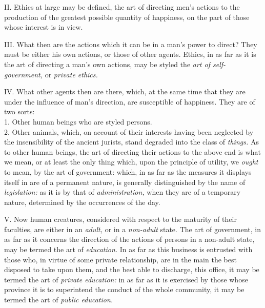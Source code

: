 \documentclass[12pt]{report}
\begin{document}
II. Ethics at large may be defined, the art of directing men's actions
to the production of the greatest possible quantity of happiness, on the
part of those whose interest is in view.

III. What then are the actions which it can be in a man's power to
direct? They must be either his own actions, or those of other agents.
Ethics, in as far as it is the art of directing a man's own actions, may
be styled the \emph{art of self-government,} or \emph{private ethics.}

IV. What other agents then are there, which, at the same time that they
are under the influence of man's direction, are susceptible of
happiness. They are of two sorts:\\
1. Other human beings who are styled persons.\\
2. Other animals, which, on account of their interests having been
neglected by the insensibility of the ancient jurists, stand degraded
into the class of \emph{things.} As to other human beings, the art of
directing their actions to the above end is what we mean, or at least
the only thing which, upon the principle of utility, we \emph{ought} to
mean, by the art of government: which, in as far as the measures it
displays itself in are of a permanent nature, is generally distinguished
by the name of \emph{legislation:} as it is by that of
\emph{administration,} when they are of a temporary nature, determined
by the occurrences of the day.

V. Now human creatures, considered with respect to the maturity of their
faculties, are either in an \emph{adult,} or in a \emph{non-adult}
state. The art of government, in as far as it concerns the direction of
the actions of persons in a non-adult state, may be termed the art of
\emph{education.} In as far as this business is entrusted with those
who, in virtue of some private relationship, are in the main the best
disposed to take upon them, and the best able to discharge, this office,
it may be termed the art of \emph{private education:} in as far as it is
exercised by those whose province it is to superintend the conduct of
the whole community, it may be termed the art of \emph{public
education.}
\end{document}
